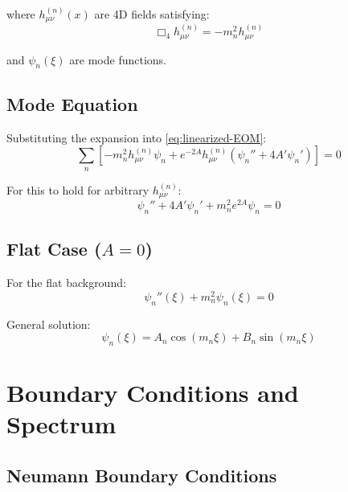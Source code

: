 \documentclass[11pt,a4paper]{article}
\begin{document}
where $h_{\mu\nu}^{(n)}(x)$ are 4D fields satisfying:
\begin{equation}
\Box_4 h_{\mu\nu}^{(n)} = -m_n^2 h_{\mu\nu}^{(n)}
\label{eq:4D-mass-eq}
\end{equation}

and $\psi_n(\xi)$ are mode functions.

\subsection{Mode Equation}

Substituting the expansion into \eqref{eq:linearized-EOM}:
\begin{equation}
\sum_n \left[ -m_n^2 h_{\mu\nu}^{(n)} \psi_n + e^{-2A} h_{\mu\nu}^{(n)}
\left( \psi_n'' + 4A' \psi_n' \right) \right] = 0
\label{eq:mode-eq-intermediate}
\end{equation}

For this to hold for arbitrary $h_{\mu\nu}^{(n)}$:
\begin{equation}
\psi_n'' + 4A' \psi_n' + m_n^2 e^{2A} \psi_n = 0
\label{eq:general-mode-eq}
\end{equation}

\subsection{Flat Case ($A = 0$)}

For the flat background:
\begin{equation}
\psi_n''(\xi) + m_n^2 \psi_n(\xi) = 0
\label{eq:flat-mode-eq}
\end{equation}

General solution:
\begin{equation}
\psi_n(\xi) = A_n \cos(m_n \xi) + B_n \sin(m_n \xi)
\label{eq:flat-mode-general}
\end{equation}

\section{Boundary Conditions and Spectrum}

\subsection{Neumann Boundary Conditions}
\end{document}
